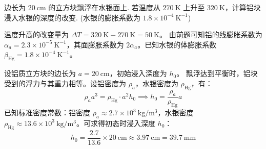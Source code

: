 \begin{exercise}\label{ex:10.5}
边长为 $20 \ \mathrm{cm}$ 的立方块飘浮在水银面上. 若温度从 $270 \ \mathrm{K}$ 上升至 $320 \ \mathrm{K}$，计算铝块浸入水银的深度的改变. (水银的膨胀系数为 $1.8 \times 10^{-4} \ \mathrm{K}^{-1}$)
\end{exercise}
\begin{solution}
温度升高的改变量为 $\Delta T = 320 \ \mathrm{K} - 270 \ \mathrm{K} = 50 \ \mathrm{K}$。
由前题可知铝的线膨胀系数为 $\alpha_a = 2.3 \times 10^{-5} \ \mathrm{K}^{-1}$，其面膨胀系数为 $2\alpha_a$。已知水银的体膨胀系数 $\beta_{\mathrm{Hg}} = 1.8 \times 10^{-4} \ \mathrm{K}^{-1}$。

设铝质立方块的边长为 $a = 20 \ \mathrm{cm}$，初始浸入深度为 $h_0$。
飘浮达到平衡时，铝块受到的浮力与其重力相等。设铝密度为 $\rho_a$，水银密度为 $\rho_{\mathrm{Hg}}$，有：
$$ \rho_a a^3 = \rho_{\mathrm{Hg}} \cdot a^2 h_0 \implies h_0 = \frac{\rho_a}{\rho_{\mathrm{Hg}}} a $$
已知标准密度常数：铝密度 $\rho_a \approx 2.7 \times 10^3 \ \mathrm{kg/m^3}$，水银密度 $\rho_{\mathrm{Hg}} \approx 13.6 \times 10^3 \ \mathrm{kg/m^3}$。可求得初态时浸入深度 $h_0$：
$$ h_0 = \frac{2.7}{13.6} \times 20 \ \mathrm{cm} \approx 3.97 \ \mathrm{cm} = 39.7 \ \mathrm{mm} $$


\end{solution}
